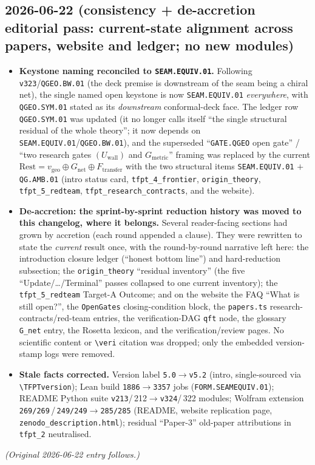 \subsection*{2026-06-22 (consistency + de-accretion editorial pass: current-state alignment across papers, website and ledger; no new modules)}
\begin{itemize}
\item \textbf{Keystone naming reconciled to \texttt{SEAM.EQUIV.01}.} Following \texttt{v323}/\texttt{QGEO.BW.01}
  (the deck premise is downstream of the seam being a chiral net), the single named open keystone is now
  \texttt{SEAM.EQUIV.01} \emph{everywhere}, with \texttt{QGEO.SYM.01} stated as its \emph{downstream}
  conformal-deck face. The ledger row \texttt{QGEO.SYM.01} was updated (it no longer calls itself ``the single
  structural residual of the whole theory''; it now depends on \texttt{SEAM.EQUIV.01}/\texttt{QGEO.BW.01}), and
  the superseded ``\texttt{GATE.QGEO} open gate'' / ``two research gates $(U_{\mathrm{wall}})$ and
  $G_{\mathrm{metric}}$'' framing was replaced by the current $\text{Rest}=v_{\mathrm{geo}}\oplus G_{\mathrm{net}}
  \oplus F_{\mathrm{transfer}}$ with the two structural items \texttt{SEAM.EQUIV.01} $+$ \texttt{QG.AMB.01}
  (intro status card, \texttt{tfpt\_4\_frontier}, \texttt{origin\_theory}, \texttt{tfpt\_5\_redteam},
  \texttt{tfpt\_research\_contracts}, and the website).
\item \textbf{De-accretion: the sprint-by-sprint reduction history was moved to this changelog, where it belongs.}
  Several reader-facing sections had grown by accretion (each round appended a clause). They were rewritten to
  state the \emph{current} result once, with the round-by-round narrative left here: the introduction closure
  ledger (``honest bottom line'') and hard-reduction subsection; the \texttt{origin\_theory} ``residual
  inventory'' (the five ``Update/\ldots/Terminal'' passes collapsed to one current inventory); the
  \texttt{tfpt\_5\_redteam} Target-A Outcome; and on the website the FAQ ``What is still open?'', the
  \texttt{OpenGates} closing-condition block, the \texttt{papers.ts} research-contracts/red-team entries, the
  verification-DAG \texttt{qft} node, the glossary \texttt{G\_net} entry, the Rosetta lexicon, and the
  verification/review pages. No scientific content or \texttt{\textbackslash veri} citation was dropped; only the
  embedded version-stamp logs were removed.
\item \textbf{Stale facts corrected.} Version label \texttt{5.0}$\to$\texttt{v5.2} (intro, single-sourced via
  \texttt{\textbackslash TFPTversion}); Lean build \texttt{1886}$\to$\texttt{3357} jobs (\texttt{FORM.SEAMEQUIV.01});
  README Python suite \texttt{v213}/\,212$\to$\texttt{v324}/\,322 modules; Wolfram extension
  \texttt{269/269}\,/\,\texttt{249/249}$\to$\texttt{285/285} (README, website replication page,
  \texttt{zenodo\_description.html}); residual ``Paper-3'' old-paper attributions in \texttt{tfpt\_2} neutralised.
\end{itemize}
\noindent\emph{(Original 2026-06-22 entry follows.)}

